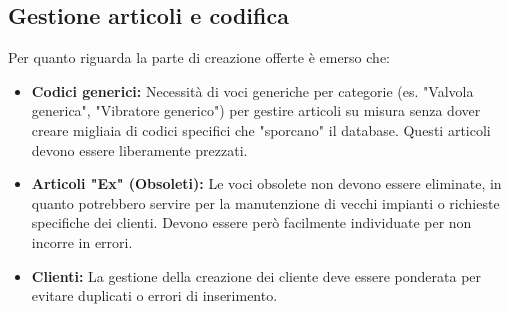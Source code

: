 \documentclass[12pt, a4paper]{article} %
\begin{document}
\subsection{Gestione articoli e codifica}
Per quanto riguarda la parte di creazione offerte è emerso che:
\begin{itemize}
      \item \textbf{Codici generici:} Necessità di voci generiche per categorie (es. "Valvola generica", "Vibratore generico") per gestire articoli su misura
            senza dover creare migliaia di codici specifici che "sporcano" il database. Questi articoli devono essere liberamente prezzati.
      \item \textbf{Articoli "Ex" (Obsoleti):} Le voci obsolete non devono essere eliminate, in quanto potrebbero servire per la manutenzione di vecchi impianti o richieste
            specifiche dei clienti. Devono essere però facilmente individuate per non incorre in errori.
      \item \textbf{Clienti:} La gestione della creazione dei cliente deve essere ponderata per evitare duplicati o errori di inserimento.
\end{itemize}
\end{document}

